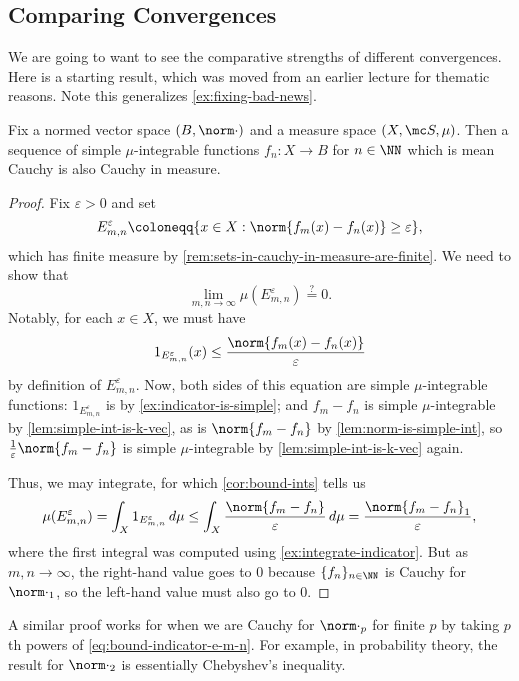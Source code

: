 \documentclass[../notes.tex]{subfiles}
\begin{document}
\subsection{Comparing Convergences}
We are going to want to see the comparative strengths of different convergences. Here is a starting result, which was moved from an earlier lecture for thematic reasons. Note this generalizes \autoref{ex:fixing-bad-news}.
\begin{lemma} \label{lem:mean-cauchy-is-cauchy-in-measure}
	Fix a normed vector space $(B,\norm\cdot)$ and a measure space $(X,\mc S,\mu)$. Then a sequence of simple $\mu$-integrable functions $f_n\colon X\to B$ for $n\in\NN$ which is mean Cauchy is also Cauchy in measure.
\end{lemma}
\begin{proof}
	Fix $\varepsilon>0$ and set
	\[E^\varepsilon_{m,n}\coloneqq\{x\in X:\norm{f_m(x)-f_n(x)}\ge\varepsilon\},\]
	which has finite measure by \autoref{rem:sets-in-cauchy-in-measure-are-finite}. We need to show that
	\[\lim_{m,n\to\infty}\mu(E_{m,n}^\varepsilon)\stackrel?=0.\]
	Notably, for each $x\in X$, we must have
	\begin{equation}
		1_{E^\varepsilon_{m,n}}(x)\le\frac{\norm{f_m(x)-f_n(x)}}\varepsilon \label{eq:bound-indicator-e-m-n}
	\end{equation}
	by definition of $E^{\varepsilon}_{m,n}$. Now, both sides of this equation are simple $\mu$-integrable functions: $1_{E^\varepsilon_{m,n}}$ is by \autoref{ex:indicator-is-simple}; and $f_m-f_n$ is simple $\mu$-integrable by \autoref{lem:simple-int-is-k-vec}, as is $\norm{f_m-f_n}$ by \autoref{lem:norm-is-simple-int}, so $\frac1\varepsilon\norm{f_m-f_n}$ is simple $\mu$-integrable by \autoref{lem:simple-int-is-k-vec} again.
	
	Thus, we may integrate, for which \autoref{cor:bound-ints} tells us
	\[\mu(E^\varepsilon_{m,n})=\int_X1_{E^{\varepsilon}_{m,n}}\,d\mu\le\int_X\frac{\norm{f_m-f_n}}\varepsilon\,d\mu=\frac{\norm{f_m-f_n}_1}\varepsilon,\]
	where the first integral was computed using \autoref{ex:integrate-indicator}. But as $m,n\to\infty$, the right-hand value goes to $0$ because $\{f_n\}_{n\in\NN}$ is Cauchy for $\norm\cdot_1$, so the left-hand value must also go to $0$.
\end{proof}
\begin{remark}
	A similar proof works for when we are Cauchy for $\norm\cdot_p$ for finite $p$ by taking $p$th powers of \autoref{eq:bound-indicator-e-m-n}. For example, in probability theory, the result for $\norm\cdot_2$ is essentially Chebyshev's inequality.
\end{remark}
\end{document}
